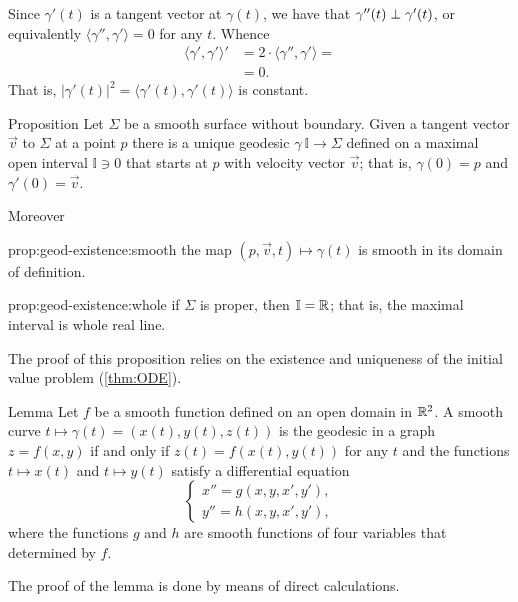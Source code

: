 Since $\gamma'(t)$ is a tangent vector at $\gamma(t)$,
we have that $\gamma''(t)\z\perp\gamma'(t)$, or equivalently $\langle\gamma'',\gamma'\rangle=0$ for any $t$.
Whence 
\begin{align*}
\langle\gamma',\gamma'\rangle'&=2\cdot \langle\gamma'',\gamma'\rangle=
\\
&=0.
\end{align*}
That is, $|\gamma'(t)|^2=\langle\gamma'(t),\gamma'(t)\rangle$ is constant.
\qeds

\begin{thm}{Proposition}\label{prop:geod-existence} 
Let $\Sigma$ be  a smooth surface without boundary.
Given a tangent vector ${\vec v}$ to $\Sigma$ at a point $p$
there is a unique geodesic $\gamma\:\mathbb{I}\to \Sigma$ defined on a maximal open interval $\mathbb{I}\ni 0$ that starts at $p$ with velocity vector ${\vec v}$;
that is, $\gamma(0)=p$ and $\gamma'(0)={\vec v}$.

Moreover
\begin{subthm}{prop:geod-existence:smooth} the map $(p,{\vec v},t)\mapsto \gamma(t)$ is smooth in its domain of definition.
\end{subthm}

\begin{subthm}{prop:geod-existence:whole} if $\Sigma$ is proper, then $\mathbb{I}=\mathbb{R}$; that is, the maximal interval is whole real line.
\end{subthm}

\end{thm}

The proof of this proposition relies on the existence and uniqueness of the initial value problem (\ref{thm:ODE}).

\begin{thm}{Lemma}\label{lem:geodesic=2nd-order}
Let $f$ be  a smooth function defined on an open domain in $\mathbb{R}^2$.
A smooth curve $t\mapsto \gamma(t)=(x(t),y(t),z(t))$ is the geodesic in a graph $z=f(x,y)$ if and only if $z(t)=f(x(t),y(t))$ for any $t$ and the functions $t\mapsto x(t)$ and $t\mapsto y(t)$
satisfy a differential equation
\[
\begin{cases}
x''=g(x,y,x',y'),
\\
y''=h(x,y,x',y'),
\end{cases}
\]
where the functions $g$ and $h$ are smooth functions of four variables that determined by $f$.
\end{thm}

The proof of the lemma is done by means of direct calculations.

